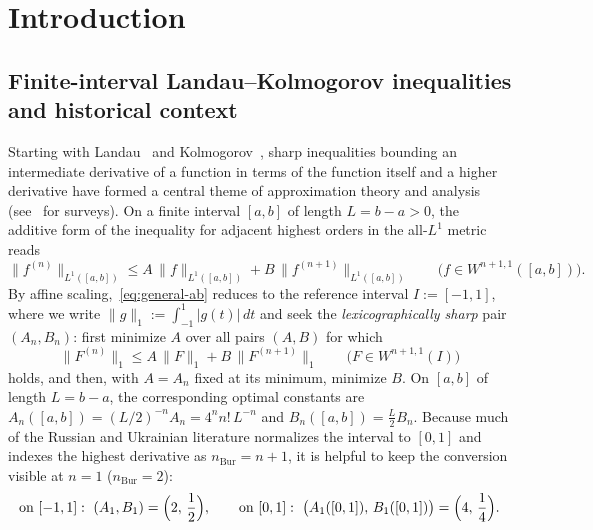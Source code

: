 \documentclass[11pt,a4paper]{article}
\newcommand{\Lone}[1]{\lVert #1\rVert_1}
\theoremstyle{remark}
\numberwithin{equation}{section}
\begin{document}
\section{Introduction}
\label{sec:intro}

\subsection{Finite-interval Landau--Kolmogorov inequalities and historical context}
\label{sec:history}

Starting with Landau~\cite{Landau1913} and Kolmogorov~\cite{Kolmogorov1939}, sharp inequalities bounding an intermediate derivative of a function in terms of the function itself and a higher derivative have formed a central theme of approximation theory and analysis (see~\cite{BKKP2003,Shadrin2014} for surveys). On a finite interval $[a,b]$ of length $L = b - a > 0$, the additive form of the inequality for adjacent highest orders in the all-$L^1$ metric reads
\begin{equation}
    \lVert f^{(n)}\rVert_{L^1([a,b])}
    \le A\,\lVert f\rVert_{L^1([a,b])} + B\,\lVert f^{(n+1)}\rVert_{L^1([a,b])}
    \qquad \bigl(f \in W^{n+1,1}([a,b])\bigr).
    \label{eq:general-ab}
\end{equation}
By affine scaling,~\eqref{eq:general-ab} reduces to the reference interval $I := [-1,1]$, where we write $\Lone{g} := \int_{-1}^{1}|g(t)|\,dt$ and seek the \emph{lexicographically sharp} pair $(A_n, B_n)$: first minimize $A$ over all pairs $(A, B)$ for which
\begin{equation}
    \Lone{F^{(n)}} \le A\,\Lone{F} + B\,\Lone{F^{(n+1)}}
    \qquad \bigl(F \in W^{n+1,1}(I)\bigr)
    \label{eq:main}
\end{equation}
holds, and then, with $A = A_n$ fixed at its minimum, minimize $B$. On $[a,b]$ of length $L = b - a$, the corresponding optimal constants are $A_n([a,b]) = (L/2)^{-n}A_n = 4^n n!\,L^{-n}$ and $B_n([a,b]) = \frac{L}{2}B_n$. Because much of the Russian and Ukrainian literature normalizes the interval to $[0,1]$ and indexes the highest derivative as $n_{\mathrm{Bur}} = n + 1$, it is helpful to keep the conversion visible at $n = 1$ ($n_{\mathrm{Bur}} = 2$):
\[
    \text{on } [-1,1]:\ (A_1, B_1) = \Bigl(2,\, \frac12\Bigr),
    \qquad
    \text{on } [0,1]:\ \bigl(A_1([0,1]),\, B_1([0,1])\bigr) = \Bigl(4,\, \frac14\Bigr).
\]
\end{document}
